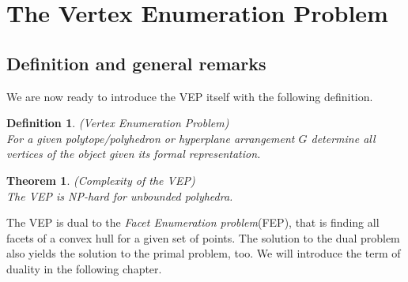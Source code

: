\documentclass[a4paper, 11pt]{article}
\newtheorem{mydef}{Definition}
\newtheorem{theorem}{Theorem}
\begin{document}
\section{The Vertex Enumeration Problem}
\subsection{Definition and general remarks}
We are now ready to introduce the VEP itself with the following definition.
\begin{mydef}(Vertex Enumeration Problem)\\
	For a given polytope/polyhedron or hyperplane arrangement $G$ determine all vertices of the object given its formal representation. 
\end{mydef}

\begin{theorem}(Complexity of the VEP)\\
	The VEP is NP-hard for unbounded polyhedra.\cite{Khachiyan}
\end{theorem}


The VEP is dual to the \textit{Facet Enumeration problem}(FEP), that is finding all facets of a convex hull for a given set of points. The solution to the dual problem also yields the solution to the primal problem, too. We will introduce the term of duality in the following chapter.\\
\end{document}
